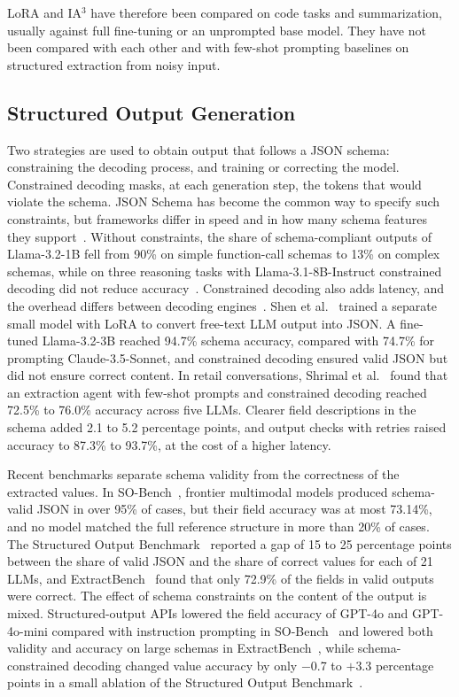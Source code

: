 \documentclass[journal,article,submit,pdftex,moreauthors]{Definitions/mdpi}
\begin{document}
LoRA and IA$^3$ have therefore been compared on code tasks and summarization, usually against full fine-tuning or an unprompted base model. They have not been compared with each other and with few-shot prompting baselines on structured extraction from noisy input.

\subsection{Structured Output Generation}\label{sec:rw-structured}

Two strategies are used to obtain output that follows a JSON schema: constraining the decoding process, and training or correcting the model. Constrained decoding masks, at each generation step, the tokens that would violate the schema. JSON Schema has become the common way to specify such constraints, but frameworks differ in speed and in how many schema features they support~\citep{geng2025jsonschemabench}. Without constraints, the share of schema-compliant outputs of Llama-3.2-1B fell from 90\% on simple function-call schemas to 13\% on complex schemas, while on three reasoning tasks with Llama-3.1-8B-Instruct constrained decoding did not reduce accuracy~\citep{geng2025jsonschemabench}. Constrained decoding also adds latency, and the overhead differs between decoding engines~\citep{chen2025pre3}. Shen et al.~\citep{shen2025slot} trained a separate small model with LoRA to convert free-text LLM output into JSON. A fine-tuned Llama-3.2-3B reached 94.7\% schema accuracy, compared with 74.7\% for prompting Claude-3.5-Sonnet, and constrained decoding ensured valid JSON but did not ensure correct content. In retail conversations, Shrimal et al.~\citep{shrimal2025parse} found that an extraction agent with few-shot prompts and constrained decoding reached 72.5\% to 76.0\% accuracy across five LLMs. Clearer field descriptions in the schema added 2.1 to 5.2 percentage points, and output checks with retries raised accuracy to 87.3\% to 93.7\%, at the cost of a higher latency.

Recent benchmarks separate schema validity from the correctness of the extracted values. In SO-Bench~\citep{feng2026so}, frontier multimodal models produced schema-valid JSON in over 95\% of cases, but their field accuracy was at most 73.14\%, and no model matched the full reference structure in more than 20\% of cases. The Structured Output Benchmark~\citep{singh2026structured} reported a gap of 15 to 25 percentage points between the share of valid JSON and the share of correct values for each of 21 LLMs, and ExtractBench~\citep{ferguson2026extractbench} found that only 72.9\% of the fields in valid outputs were correct. The effect of schema constraints on the content of the output is mixed. Structured-output APIs lowered the field accuracy of GPT-4o and GPT-4o-mini compared with instruction prompting in SO-Bench~\citep{feng2026so} and lowered both validity and accuracy on large schemas in ExtractBench~\citep{ferguson2026extractbench}, while schema-constrained decoding changed value accuracy by only $-$0.7 to $+$3.3 percentage points in a small ablation of the Structured Output Benchmark~\citep{singh2026structured}.
\end{document}
